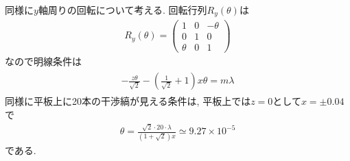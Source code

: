 同様に$y$軸周りの回転について考える.
回転行列$R_y(\theta)$は
\begin{align}
  R_y(\theta)=\left(\begin{array}{ccc}
    1&0&-\theta\\
    0&1&0\\
    \theta&0&1
  \end{array}\right)
\end{align}
なので明線条件は
\begin{align}
  \begin{split}
    -\frac{z\theta}{\sqrt{2}}-\left(\frac{1}{\sqrt{2}}+1\right)x\theta=m\lambda
  \end{split}
\end{align}
同様に平板上に20本の干渉縞が見える条件は,
平板上では$z=0$として$x=\pm0.04$で
\begin{align}
  \theta=\frac{\sqrt{2}\cdot20\cdot\lambda}{(1+\sqrt{2})x}\simeq9.27\times10^{-5}
\end{align}
である.